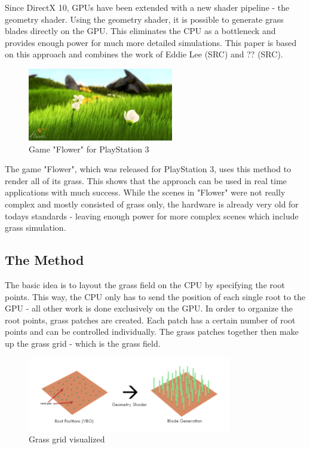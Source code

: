 \documentclass[conference]{acmsiggraph}
\begin{document}
Since DirectX 10, GPUs have been extended with a new shader pipeline - the geometry shader. Using the geometry shader, it is possible to generate grass blades directly on the GPU. This eliminates the CPU as a bottleneck and provides enough power for much more detailed simulations. This paper is based on this approach and combines the work of Eddie Lee (SRC) and ?? (SRC).

 \begin{figure}[ht]
   \centering
   \includegraphics[width=2.5in]{images/flower_game}
   \caption{Game "Flower" for PlayStation 3}
 \end{figure}    
 
The game "Flower", which was released for PlayStation 3, uses this method to render all of its grass. This shows that the approach can be used in real time applications with much success. While the scenes in "Flower" were not really complex and mostly consisted of grass only, the hardware is already very old for todays standards - leaving enough power for more complex scenes which include grass simulation.

\subsection{The Method}
The basic idea is to layout the grass field on the CPU by specifying the root points. This way, the CPU only has to send the position of each single root to the GPU - all other work is done exclusively on the GPU. In order to organize the root points, grass patches are created. Each patch has a certain number of root points and can be controlled individually. The grass patches together then 
make up the grass grid - which is the grass field.

 \begin{figure}[ht]
   \centering
   \includegraphics[width=3.5in]{images/grass_grid}
   \caption{Grass grid visualized}
 \end{figure}
\end{document}
